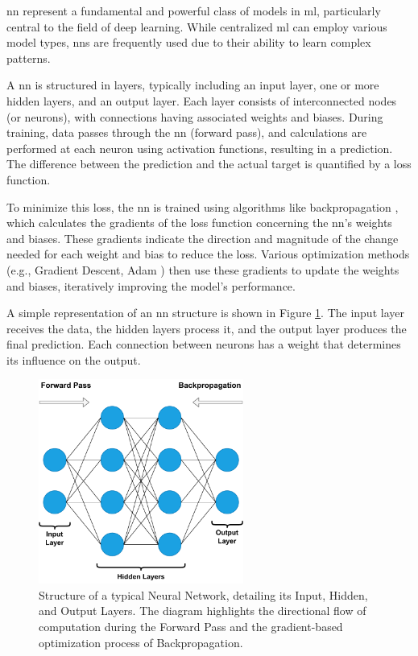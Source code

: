 \ac{nn} represent a fundamental and powerful class of models in \ac{ml}, particularly central to the field of deep learning. While centralized \ac{ml} can employ various model types, \acp{nn} are frequently used due to their ability to learn complex patterns.

A \ac{nn} is structured in layers, typically including an input layer, one or more hidden layers, and an output layer. Each layer consists of interconnected nodes (or neurons), with connections having associated weights and biases. During training, data passes through the \ac{nn} (forward pass), and calculations are performed at each neuron using activation functions, resulting in a prediction. The difference between the prediction and the actual target is quantified by a loss function. 

To minimize this loss, the \ac{nn} is trained using algorithms like backpropagation \cite{rumelhart1986learning}, which calculates the gradients of the loss function concerning the \ac{nn}'s weights and biases. These gradients indicate the direction and magnitude of the change needed for each weight and bias to reduce the loss. Various optimization methods (e.g., Gradient Descent, Adam \cite{kingma2014adam}) then use these gradients to update the weights and biases, iteratively improving the model's performance. 

A simple representation of an \ac{nn} structure is shown in Figure \ref{fig:nn_structure}. The input layer receives the data, the hidden layers process it, and the output layer produces the final prediction. Each connection between neurons has a weight that determines its influence on the output.

\begin{figure}[!htb]
    \centering
    \includegraphics[width=0.6\textwidth]{figs/nn_structure.pdf}
    \caption[Neural Network Structure]{Structure of a typical Neural Network, detailing its Input, Hidden, and Output Layers. The diagram highlights the directional flow of computation during the Forward Pass and the gradient-based optimization process of Backpropagation.}
    \label{fig:nn_structure}
\end{figure}

